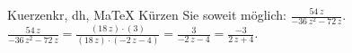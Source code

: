 \begin{MAufgabe}{Kuerzen}{kr, dh, MaTeX}
K\"urzen Sie soweit m\"oglich: $\frac{54\, z}{ - 36\, z^2 - 72\, z}$.\\ 
\ifLsg\MLoesung
\quad $\frac{54\, z}{ - 36\, z^2 - 72\, z}=\frac{(18\, z)\cdot(3)}{(18\, z)\cdot( - 2\, z - 4)}=\frac{3}{ - 2\, z - 4}=\frac{-3}{2\, z + 4}$.\else\relax\fi
 \end{MAufgabe}